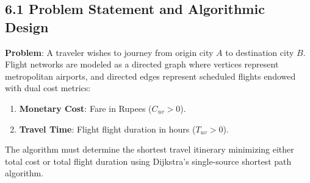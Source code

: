\documentclass[12pt]{article}
\begin{document}
\subsection*{6.1 Problem Statement and Algorithmic Design}
\textbf{Problem}: A traveler wishes to journey from origin city $A$ to destination city $B$. Flight networks are modeled as a directed graph where vertices represent metropolitan airports, and directed edges represent scheduled flights endowed with dual cost metrics:
\begin{enumerate}
    \item \textbf{Monetary Cost}: Fare in Rupees ($C_{uv} > 0$).
    \item \textbf{Travel Time}: Flight flight duration in hours ($T_{uv} > 0$).
\end{enumerate}
The algorithm must determine the shortest travel itinerary minimizing either total cost or total flight duration using Dijkstra's single-source shortest path algorithm.
\end{document}
